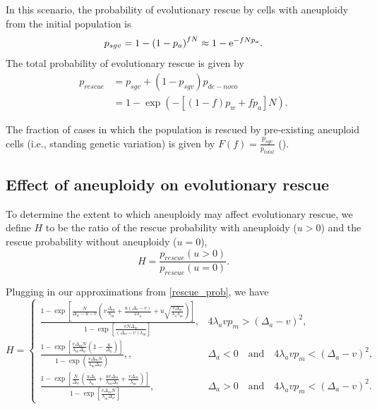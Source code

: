 \documentclass[12pt]{extarticle}
\newcommand{\e}{{\rm e}}
\begin{document}
In this scenario, the probability of evolutionary rescue by cells with aneuploidy from the initial population is
\begin{equation*}
p_{sgv} = 1-\left(1-p_a\right)^{fN}\approx 1-\e^{-fNp_a}. 
\end{equation*}
The total probability of evolutionary rescue is given by
\begin{align}\nonumber
p_{rescue} 	&= p_{sgv}+\left(1-p_{sgv}\right)p_{de-novo} \\
			&= 1-\exp\left(-\left[\left(1-f\right)p_w + fp_a\right]N\right) .
\end{align}

The fraction of cases in which the population is rescued by pre-existing aneuploid cells (i.e., standing genetic variation) is given by $F\left(f\right)=\frac{p_{sgv}}{p_{total}}$ ().


\subsection*{Effect of aneuploidy on evolutionary rescue}
To determine the extent to which aneuploidy may affect evolutionary rescue, we define $H$ to be the ratio of the rescue probability with aneuploidy ($u>0$) and the rescue probability without aneuploidy ($u=0$),
\begin{equation}\label{ratiorescueexact}
H = \frac{p_{rescue}(u>0)}{p_{rescue}(u=0)}.
\end{equation}

Plugging in our approximations from \cref{rescue_prob}, we have
\begin{equation}\label{ratiorescue}
H = \begin{cases}
\frac{1-\exp\left[\frac{N}{\Delta_w-u-v}\left(v\frac{\Delta_m}{\lambda_m}+\frac{u\left(\Delta_a-v\right)}{2\lambda_a}+u\sqrt{\frac{v\Delta_m}{\lambda_a\lambda_m}}\right)\right]}{1-\exp\left[\frac{vN\Delta_m}{\left(\Delta_w-v\right)\lambda_m}\right]} ,&
4\lambda_avp_m>\left(\Delta_a-v\right)^2 ,\\
\frac{1-\exp\left[\frac{v\Delta_mN}{\lambda_m\Delta_w}\left(1-\frac{u}{\Delta_a}\right)\right]}{1-\exp\left(\frac{v\Delta_mN}{\lambda_m\Delta_w}\right)}, ,&
\Delta_a<0\quad\text{and}\quad4\lambda_avp_m<\left(\Delta_a-v\right)^2 ,\\
\frac{1-\exp\left[\frac{N}{\Delta_w}\left(\frac{u\Delta_a}{\lambda_a}+\frac{uv\Delta_m}{\lambda_m\Delta_a}+\frac{v\Delta_m}{\lambda_m}\right)\right]}{1-\exp\left[\frac{v\Delta_mN}{\lambda_m\Delta_w}\right]} ,&
\Delta_a>0\quad\text{and}\quad4\lambda_avp_m<\left(\Delta_a-v\right)^2. %
  \end{cases}
\end{equation}
\end{document}
